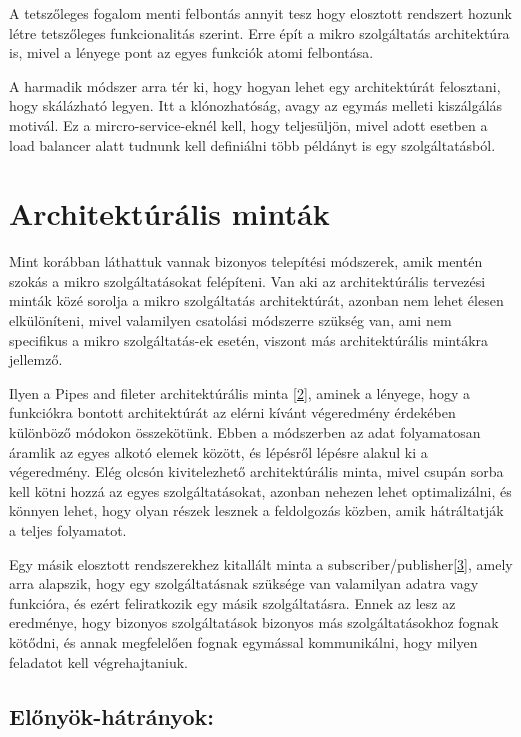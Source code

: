 \documentclass[11pt,magyar,a4paper,oneside,]{report}
\begin{document}
A tetszőleges fogalom menti felbontás annyit tesz hogy elosztott
rendszert hozunk létre tetszőleges funkcionalitás szerint. Erre épít a
mikro szolgáltatás architektúra is, mivel a lényege pont az egyes
funkciók atomi felbontása.

A harmadik módszer arra tér ki, hogy hogyan lehet egy architektúrát
felosztani, hogy skálázható legyen. Itt a klónozhatóság, avagy az egymás
melleti kiszálgálás motivál. Ez a mircro-service-eknél kell, hogy
teljesüljön, mivel adott esetben a load balancer alatt tudnunk kell
definiálni több példányt is egy szolgáltatásból.

\section{Architektúrális minták}\label{architektuxfaruxe1lis-mintuxe1k}

Mint korábban láthattuk vannak bizonyos telepítési módszerek, amik
mentén szokás a mikro szolgáltatásokat felépíteni. Van aki az
architektúrális tervezési minták közé sorolja a mikro szolgáltatás
architektúrát, azonban nem lehet élesen elkülöníteni, mivel valamilyen
csatolási módszerre szükség van, ami nem specifikus a mikro
szolgáltatás-ek esetén, viszont más architektúrális mintákra jellemző.

Ilyen a Pipes and fileter architektúrális minta
\href{https://msdn.microsoft.com/en-us/library/dn568100.aspx}{{[}2{]}},
aminek a lényege, hogy a funkciókra bontott architektúrát az elérni
kívánt végeredmény érdekében különböző módokon összekötünk. Ebben a
módszerben az adat folyamatosan áramlik az egyes alkotó elemek között,
és lépésről lépésre alakul ki a végeredmény. Elég olcsón kivitelezhető
architektúrális minta, mivel csupán sorba kell kötni hozzá az egyes
szolgáltatásokat, azonban nehezen lehet optimalizálni, és könnyen lehet,
hogy olyan részek lesznek a feldolgozás közben, amik hátráltatják a
teljes folyamatot.

Egy másik elosztott rendszerekhez kitallált minta a
subscriber/publisher\href{https://msdn.microsoft.com/en-us/library/ff649664.aspx}{{[}3{]}},
amely arra alapszik, hogy egy szolgáltatásnak szüksége van valamilyan
adatra vagy funkcióra, és ezért feliratkozik egy másik szolgáltatásra.
Ennek az lesz az eredménye, hogy bizonyos szolgáltatások bizonyos más
szolgáltatásokhoz fognak kötődni, és annak megfelelően fognak egymással
kommunikálni, hogy milyen feladatot kell végrehajtaniuk.

\subsection{Előnyök-hátrányok:}\label{elux151nyuxf6k-huxe1truxe1nyok}
\end{document}
